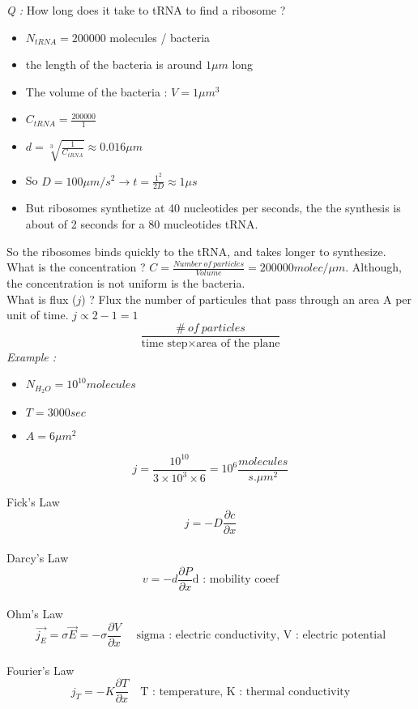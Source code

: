 \documentclass[10pt,a4paper]{article}
\begin{document}
\emph{Q :} How long does it take to tRNA to find a ribosome ?\\
\begin{itemize}
    \item $N_{tRNA} = 200 000$ molecules / bacteria
    \item the length of the bacteria is around $1\mu m$ long
    \item The volume of the bacteria : $V = 1 \mu m^3$
    \item $C_{tRNA} = \frac{200 000}{1}$
    \item $d=\sqrt[3]{\frac{1}{C_{tRNA}}} \approx 0.016\mu m$
    \item So $D= 100 \mu m /s^2 \rightarrow t=\frac{1^2}{2D} \approx 1\mu s$
    \item But ribosomes synthetize at 40 nucleotides per seconds, the the synthesis is about of 2 seconds for a 80 mucleotides tRNA.
\end{itemize}
So the ribosomes binds quickly to the tRNA, and takes longer to synthesize.\\

What is the concentration ? $C=\frac{Number~of~particles}{Volume} = 200 000 molec/\mu m$. Although, the concentration is not uniform is the bacteria.\\
What is flux ($j$) ? Flux the number of particules that pass through an area A per unit of time. $j \propto 2-1 = 1$
\[ \frac{\#~of~particles}{\text{time step} \times \text{area of the plane}} \]
\emph{Example :}
\begin{itemize}
    \item $N_{H_2 O} = 10^{10} molecules$
    \item $T = 3000 sec$
    \item $A = 6 \mu m^2$
\end{itemize}
\[ j =  \frac{10 ^ {10} }{3\times 10^3 \times 6} = 10^6 \frac{molecules}{s.\mu m^2} \]

Fick's Law
\[j = -D\frac{\partial c}{\partial x} \]
~\\
Darcy's Law
\[ v= -d\frac{\partial P}{\partial x} \text{d : mobility coeef} \]
~\\
Ohm's Law
\[ \overrightarrow{j_E} = \sigma \overrightarrow{E} = -\sigma \frac{\partial V}{\partial x} \text{ ~~~sigma : electric conductivity, V : electric potential} \]
~\\
Fourier's Law
\[ j_T = -K\frac{\partial T}{\partial x} \text{~~~T : temperature, K : thermal conductivity}\]
~\\
\end{document}
